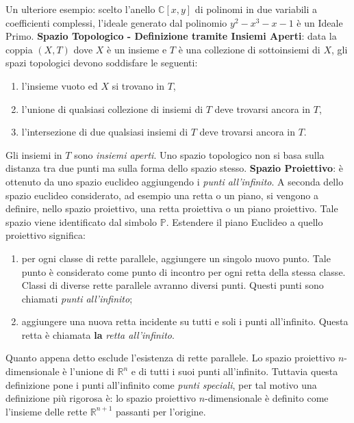 \documentclass[a4paper,12pt]{tesiinfo}
\begin{document}
Un ulteriore esempio: scelto l'anello $\mathbb{C}[x, y]$ di polinomi in due variabili a coefficienti complessi, l'ideale generato dal polinomio $y^2 - x^3 -x -1$ \`e un Ideale Primo.
\newline\newline
%
%
%
\textbf{Spazio Topologico - Definizione tramite Insiemi Aperti}: data la coppia $(X, T)$ dove $X$ \`e un insieme e $T$ \`e una collezione di sottoinsiemi di $X$, gli spazi topologici devono soddisfare le seguenti:
\begin{enumerate}
    \item l'insieme vuoto ed $X$ si trovano in $T$,
    \item l'unione di qualsiasi collezione di insiemi di $T$ deve trovarsi ancora in $T$,
    \item l'intersezione di due qualsiasi insiemi di $T$ deve trovarsi ancora in $T$.
\end{enumerate}
Gli insiemi in $T$ sono \textit{insiemi aperti}.
\newline
Uno spazio topologico non si basa sulla distanza tra due punti ma sulla forma dello spazio stesso.
\newline\newline
%
%
%
\textbf{Spazio Proiettivo}: \`e ottenuto da uno spazio euclideo aggiungendo i \textit{punti all'infinito}. A seconda dello spazio euclideo considerato, ad esempio una retta o un piano, si vengono a definire, nello spazio proiettivo, una retta proiettiva o un piano proiettivo. Tale spazio viene identificato dal simbolo $\mathbb{P}$.
\newline
Estendere il piano Euclideo a quello proiettivo significa:
\begin{enumerate}
    \item per ogni classe di rette parallele, aggiungere un singolo nuovo punto. Tale punto \`e considerato come punto di incontro per ogni retta della stessa classe. Classi di diverse rette parallele avranno diversi punti. Questi punti sono chiamati \textit{punti all'infinito};
    \item aggiungere una nuova retta incidente su tutti e soli i punti all'infinito. Questa retta \`e chiamata \textbf{la} \textit{retta all'infinito}.
\end{enumerate}
Quanto appena detto esclude l'esistenza di rette parallele.
\newline
Lo spazio proiettivo $n$-dimensionale \`e l'unione di $\mathbb{R}^n$ e di tutti i suoi punti all'infinito. Tuttavia questa definizione pone i punti all'infinito come \textit{punti speciali}, per tal motivo una definizione pi\`u rigorosa \`e: lo spazio proiettivo $n$-dimensionale \`e definito come l'insieme delle rette $\mathbb{R}^ {n+1}$ passanti per l'origine.
\end{document}
